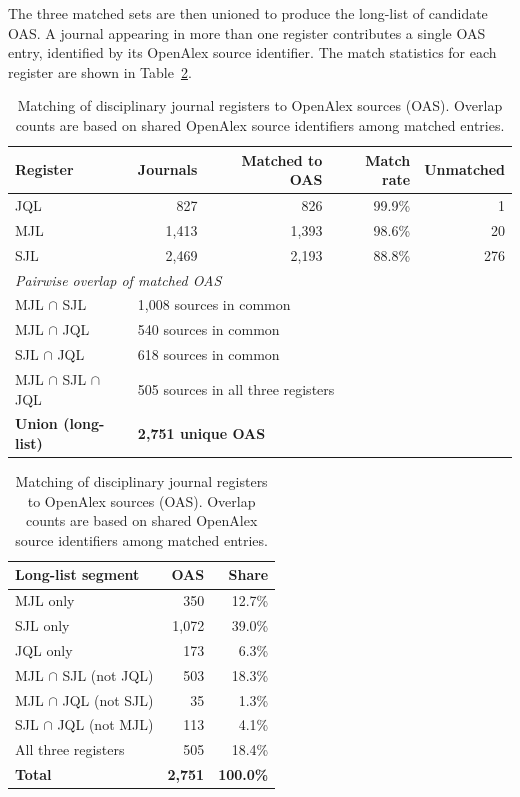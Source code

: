 The three matched sets are then unioned to produce the long-list of candidate OAS.
A journal appearing in more than one register contributes a single OAS entry,
identified by its OpenAlex source identifier.
The match statistics for each register are shown in Table~\ref{tab:oas_matching}.

\begin{table}[ht]
\centering
\caption{Matching of disciplinary journal registers to OpenAlex sources (OAS).
         Overlap counts are based on shared OpenAlex source identifiers among matched entries.}
\label{tab:oas_matching}
\small
\begin{tabular}{lrrrr}
\toprule
\textbf{Register} & \textbf{Journals} & \textbf{Matched to OAS} & \textbf{Match rate} & \textbf{Unmatched} \\
\midrule
JQL  &    827 &    826 & 99.9\% &   1 \\
MJL  & 1{,}413 & 1{,}393 & 98.6\% &  20 \\
SJL  & 2{,}469 & 2{,}193 & 88.8\% & 276 \\
\midrule
\multicolumn{5}{l}{\textit{Pairwise overlap of matched OAS}} \\
\quad MJL $\cap$ SJL  & \multicolumn{4}{l}{1{,}008 sources in common} \\
\quad MJL $\cap$ JQL  & \multicolumn{4}{l}{540 sources in common} \\
\quad SJL $\cap$ JQL  & \multicolumn{4}{l}{618 sources in common} \\
\quad MJL $\cap$ SJL $\cap$ JQL & \multicolumn{4}{l}{505 sources in all three registers} \\
\midrule
\textbf{Union (long-list)} & \multicolumn{4}{l}{\textbf{2{,}751 unique OAS}} \\
\bottomrule
\end{tabular}

\bigskip
\begin{tabular}{lrr}
\toprule
\textbf{Long-list segment} & \textbf{OAS} & \textbf{Share} \\
\midrule
MJL only                      &  350 & 12.7\% \\
SJL only                      & 1{,}072 & 39.0\% \\
JQL only                      &  173 &  6.3\% \\
MJL $\cap$ SJL (not JQL)      &  503 & 18.3\% \\
MJL $\cap$ JQL (not SJL)      &   35 &  1.3\% \\
SJL $\cap$ JQL (not MJL)      &  113 &  4.1\% \\
All three registers           &  505 & 18.4\% \\
\midrule
\textbf{Total}                & \textbf{2{,}751} & \textbf{100.0\%} \\
\bottomrule
\end{tabular}
\end{table}

